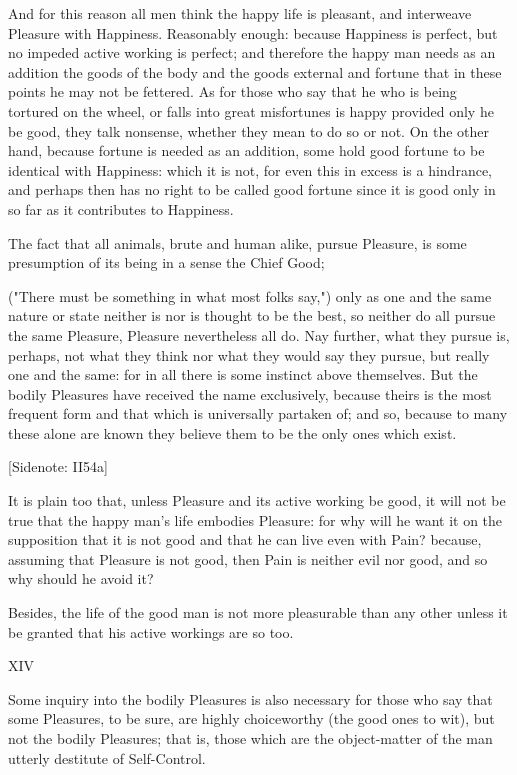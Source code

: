And for this reason all men think the happy life is pleasant, and
interweave Pleasure with Happiness. Reasonably enough: because Happiness
is perfect, but no impeded active working is perfect; and therefore
the happy man needs as an addition the goods of the body and the goods
external and fortune that in these points he may not be fettered. As for
those who say that he who is being tortured on the wheel, or falls into
great misfortunes is happy provided only he be good, they talk nonsense,
whether they mean to do so or not. On the other hand, because fortune
is needed as an addition, some hold good fortune to be identical with
Happiness: which it is not, for even this in excess is a hindrance, and
perhaps then has no right to be called good fortune since it is good
only in so far as it contributes to Happiness.

The fact that all animals, brute and human alike, pursue Pleasure, is
some presumption of its being in a sense the Chief Good;

("There must be something in what most folks say,") only as one and
the same nature or state neither is nor is thought to be the best, so
neither do all pursue the same Pleasure, Pleasure nevertheless all do.
Nay further, what they pursue is, perhaps, not what they think nor what
they would say they pursue, but really one and the same: for in all
there is some instinct above themselves. But the bodily Pleasures have
received the name exclusively, because theirs is the most frequent form
and that which is universally partaken of; and so, because to many these
alone are known they believe them to be the only ones which exist.

[Sidenote: II54a]

It is plain too that, unless Pleasure and its active working be good, it
will not be true that the happy man's life embodies Pleasure: for why
will he want it on the supposition that it is not good and that he can
live even with Pain? because, assuming that Pleasure is not good, then
Pain is neither evil nor good, and so why should he avoid it?

Besides, the life of the good man is not more pleasurable than any other
unless it be granted that his active workings are so too.

XIV

Some inquiry into the bodily Pleasures is also necessary for those who
say that some Pleasures, to be sure, are highly choiceworthy (the good
ones to wit), but not the bodily Pleasures; that is, those which are the
object-matter of the man utterly destitute of Self-Control.

